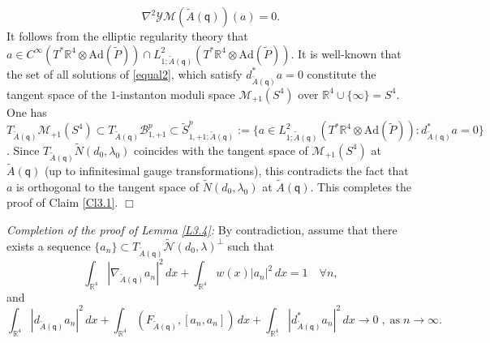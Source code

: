 \documentclass[11pt]{article}
\numberwithin{equation}{section} \setlength{\topmargin}{-35pt}
\newcommand{\R}{\mathbb{R}}
\newcommand{\Ad}{\text{Ad}}
\newcommand{\YM}{\mathcal{YM}}
\newcommand{\q}{\mathsf{q}}
\begin{document}
\begin{equation}
\label{equal2} \nabla^2\YM(\tilde{A}(\q))(a)=0.
\end{equation}
It follows from the elliptic regularity theory that $a\in
C^{\infty}(T^{\ast}\R^4\otimes\Ad(\tilde{P}))\cap
L^2_{1;\tilde{A}(\q)}(T^{\ast}\R^4\otimes\Ad(\tilde{P}))$. It is
well-known that the set of all solutions of \eqref{equal2}, which
satisfy $d_{\tilde{A}(\q)}^{\ast}a=0$ constitute the tangent space
of the $1$-instanton moduli space $\mathcal{M}_{+1}(S^4)$ over
$\R^4\cup\{\infty\}=S^4$. One has
$T_{\tilde{A}(\q)}\mathcal{M}_{+1}(S^4)\subset
T_{\tilde{A}(\q)}\mathcal{B}^p_{1,+1}\subset\tilde{S}^p_{1,+1;\tilde{A}(\q)}:=\{a\in
L^2_{1;\tilde{A}(\q)}(T^{\ast}\R^4\otimes\Ad(\tilde{P})):d_{\tilde{A}(\q)}^{\ast}a=0\}$.
Since $T_{\tilde{A}(\q)}\tilde{N}(d_0,\lambda_0)$ coincides with the
tangent space of $\mathcal{M}_{+1}(S^4)$ at $\tilde{A}(\q)$ (up to
infinitesimal gauge transformations), this contradicts the fact that
$a$ is orthogonal to the tangent space of $\tilde{N}(d_0,\lambda_0)$
at $\tilde{A}(\q)$. This completes the proof of Claim \ref{Cl3.1}.
\hfill$\Box$

\medskip

\textit{Completion of the proof of Lemma \ref{L3.4}:} By
contradiction, assume that there exists a sequence  $\{a_n\}\subset
T_{\tilde{A}(\q)}\tilde{\mathcal N}(d_0,\lambda)^{\perp}$ such that
\begin{equation}
\label{sequence}
\int_{\R^4}|\nabla_{\tilde{A}(\q)}a_n|^2\,dx+\int_{\R^4}w(x)|a_n|^2\,dx=1\quad
\forall n,
\end{equation}
and
\begin{equation}
\label{to0}
\int_{\R^4}|d_{\tilde{A}(\q)}a_n|^2\,dx+\int_{\R^4}(F_{\tilde{A}(\q)},[a_n,a_n])\,dx+
\int_{\R^4}|d_{\tilde{A}(\q)}^{\ast}a_n|^2\,dx\to 0\;,\;
\text{as}\;n\to\infty.
\end{equation}
\end{document}
